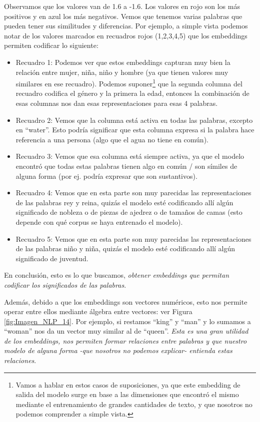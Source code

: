 \documentclass[12pt,a4paper]{article}
\begin{document}
\begin{sloppypar}
Observamos que los valores van de 1.6 a -1.6. Los valores en rojo son los más positivos y en azul los más negativos. Vemos que tenemos varias palabras que pueden tener sus similitudes y diferencias. Por ejemplo, a simple vista podemos notar de los valores marcados en recuadros rojos (1,2,3,4,5) que los embeddings permiten codificar lo siguiente:
\begin{itemize}
\item Recuadro 1: Podemos ver que estos embeddings capturan muy bien la relación entre mujer, niña, niño y hombre (ya que tienen valores muy similares en ese recuadro). Podemos suponer\footnote{Vamos a hablar en estos casos de suposiciones, ya que este embedding de salida del modelo surge en base a las dimensiones que encontró el mismo mediante el entrenamiento de grandes cantidades de texto, y que nosotros no podemos comprender a simple vista.} que la segunda columna del recuadro codifica el género y la primera la edad, entonces la combinación de esas columnas nos dan esas representaciones para esas 4 palabras. 
\item Recuadro 2: Vemos que la columna está activa en todas las palabras, excepto en “water”. Esto podría significar que esta columna expresa si la palabra hace referencia a una persona (algo que el agua no tiene en común).
\item Recuadro 3: Vemos que esa columna está siempre activa, ya que el modelo encontró que todas estas palabras tienen algo en común / son símiles de alguna forma (por ej. podría expresar que son sustantivos). 
\item Recuadro 4: Vemos que en esta parte son muy parecidas las representaciones de las palabras rey y reina, quizás el modelo esté codificando allí algún significado de nobleza o de piezas de ajedrez o de tamaños de camas (esto depende con qué corpus se haya entrenado el modelo). 
\item Recuadro 5: Vemos que en esta parte son muy parecidas las representaciones de las palabras niño y niña, quizás el modelo esté codificando allí algún significado de juventud. 
\end{itemize}
En conclusión, esto es lo que buscamos, \textit{obtener embeddings que permitan codificar los significados de las palabras}.

Además, debido a que los embeddings son vectores numéricos, esto nos permite operar entre ellos mediante álgebra entre vectores: ver Figura \ref{fig:Imagen_NLP_14}. Por ejemplo, si restamos “king” y “man” y lo sumamos a “woman” nos da un vector muy similar al de “queen”. \textit{Esta es una gran utilidad de los embeddings, nos permiten formar relaciones entre palabras y que nuestro modelo de alguna forma -que nosotros no podemos explicar- entienda estas relaciones}.


\end{sloppypar}
\end{document}
